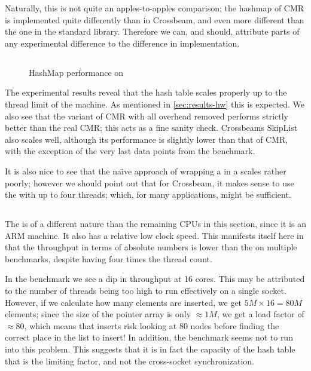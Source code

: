 Naturally, this is not quite an apples-to-apples comparison; the hashmap of CMR is implemented
quite differently than in Crossbeam, and even more different than the one in the standard library.
Therefore we can, and should, attribute parts of any experimental difference to the difference in
implementation.


\clearpage
\subsection{\gribb}

\begin{figure}[ht]
  \centering
  \caption{HashMap performance on \gribb}
\end{figure}

The experimental results reveal that the hash table scales properly up to the thread limit of the
machine. As mentioned in \cref{sec:results-hw} this is expected. We also see that the variant of
CMR with all overhead removed performs strictly better than the real CMR\@; this acts as a fine
sanity check. Crossbeams SkipList also scales well, although its performance is slightly lower than
that of CMR, with the exception of the very last data points from the  benchmark.

It is also nice to see that the na\"\i{}ve approach of wrapping a  in a 
scales rather poorly; however we should point out that for Crossbeam, it makes sense to use the
 with up to four threads; which, for many applications, might be sufficient.

\clearpage
\subsection{\scaleway}

The \scaleway is of a different nature than the remaining CPUs in this section, since it is an ARM
machine. It also has a relative low clock speed. This manifests itself here in that the throughput
in terms of absolute numbers is lower than the \gribb{} on multiple benchmarks, despite having four
times the thread count.

In the  benchmark we see a dip in throughput at 16 cores. This may be attributed to
the number of threads being too high to run effectively on a single socket. However, if we
calculate how many elements are inserted, we get $5M \times 16 = 80M$ elements; since the size of
the pointer array is only $\approx 1M$,  we get a load factor of $\approx 80$, which means that
inserts risk looking at 80 nodes before finding the correct place in the list to insert!
In addition, the  benchmark seems not to run into this problem. This suggests that it
is in fact the capacity of the hash table that is the limiting factor, and not the cross-socket
synchronization.

